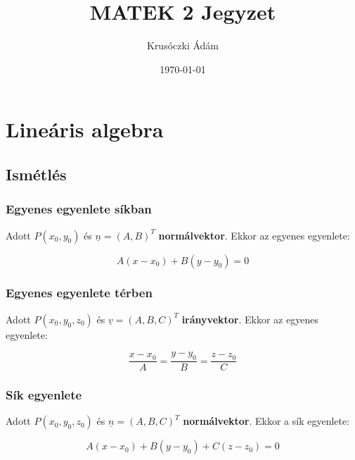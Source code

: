 \documentclass{article}
\title{MATEK 2 Jegyzet}
\author{Krusóczki Ádám}
\date{\today}
\begin{document}
\tableofcontents

\newpage

\maketitle

\section{Lineáris algebra}

\subsection{Ismétlés}

\subsubsection{Egyenes egyenlete síkban}
    Adott $P(x_0, y_0)$ és $\underline{n} = \left( A, B \right)^T$ \textbf{normálvektor}. Ekkor az egyenes egyenlete:

\begin{equation*}
    A(x-x_0) + B(y-y_0) = 0
\end{equation*}

\subsubsection{Egyenes egyenlete térben}
    Adott $P(x_0, y_0, z_0)$ és $\underline{v} = \left( A, B, C \right)^T$ \textbf{irányvektor}. Ekkor az egyenes egyenlete:

\begin{equation*}
    \frac{x-x_0}{A} = \frac{y-y_0}{B} = \frac{z-z_0}{C}
\end{equation*}

\subsubsection{Sík egyenlete}
    Adott $P(x_0, y_0, z_0)$ és $\underline{n} = \left( A, B, C \right)^T$ \textbf{normálvektor}. Ekkor a sík egyenlete:

\begin{equation*}
    A(x-x_0) + B(y-y_0) + C(z-z_0) = 0
\end{equation*}
\end{document}
